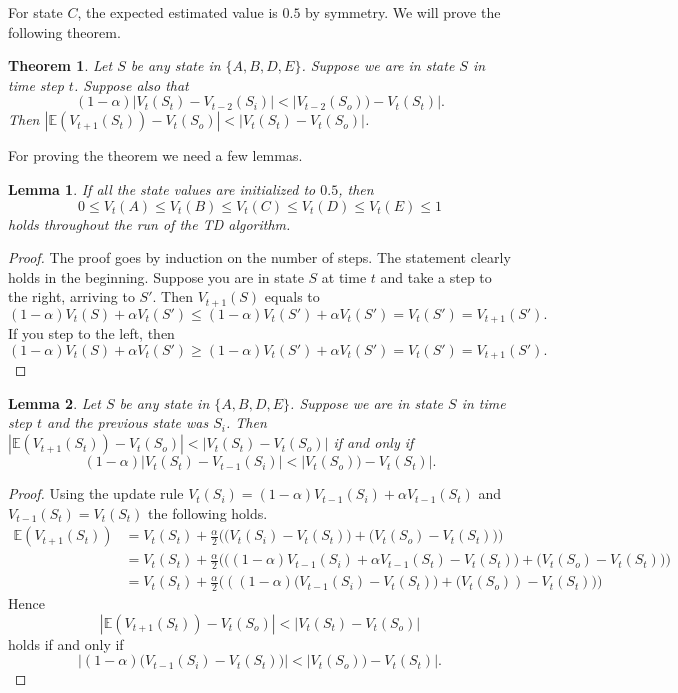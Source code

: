 \documentclass[12pt,a4paper]{article}
\newtheorem{lemma}{Lemma}
\newtheorem{thm}{Theorem}
\begin{document}
\begin{enumerate}
For state $C$, the expected estimated value is $0.5$ by symmetry. We will prove
the following theorem.
\begin{thm}\label{thm}
  Let $S$ be any state in $\{A, B, D, E\}$. Suppose we are in state $S$ in
  time step $t$. Suppose also that
  \[(1 - \alpha) |V_t(S_t) - V_{t - 2} (S_i)| < |V_{t - 2}(S_o)) - V_t(S_t)|.\] Then
  $|\mathbb{E}(V_{t + 1}(S_t)) - V_{t}(S_o)| < |V_t(S_t) - V_{t}(S_o)|$.
\end{thm}

For proving the theorem we need a few lemmas.

\begin{lemma}
  If all the state values are initialized to $0.5$, then
  \[0 \le V_t(A) \le V_t(B) \le V_t(C) \le V_t(D) \le V_t(E) \le 1\] holds throughout the
  run of the TD algorithm.
\end{lemma}
\begin{proof}
  The proof goes by induction on the number of steps. The statement clearly holds
  in the beginning. Suppose you are in state $S$ at time $t$ and take a step
  to the right, arriving to $S'$. Then $V_{t + 1}(S)$ equals to
  \[(1 - \alpha) V_t(S) + \alpha V_t(S') \le (1 - \alpha) V_t(S') + \alpha V_t(S') = V_t(S') = V_{t + 1}(S').\]
  If you step to the left, then
  \[(1 - \alpha) V_t(S) + \alpha V_t(S') \ge (1 - \alpha) V_t(S') + \alpha V_t(S') = V_t(S') = V_{t + 1}(S').\]
\end{proof}

\begin{lemma}
  Let $S$ be any state in $\{A, B, D, E\}$. Suppose we are in state $S$ in
  time step $t$ and the previous state was $S_i$. Then
  $|\mathbb{E}(V_{t + 1}(S_t)) - V_{t}(S_o)| < |V_t(S_t) - V_{t}(S_o)|$ if and only if
  \[
  (1 - \alpha) |V_t(S_t) - V_{t - 1} (S_i)| < |V_t(S_o)) - V_t(S_t)|.
  \]
\end{lemma}
\begin{proof}
  Using the update rule $ V_t(S_i) = (1 - \alpha) V_{t - 1}(S_i) + \alpha V_{t - 1}(S_t)$
  and $V_{t - 1}(S_t) = V_t(S_t)$ the following holds.
  \begin{align*}
  \mathbb{E}(V_{t + 1}(S_t))
  & = V_t(S_t) + \frac{\alpha}{2} \Big(\big(V_t(S_i) - V_t(S_t)\big) + \big(V_t(S_o) - V_t(S_t)\big)\Big)\\
  & = V_t(S_t) + \frac{\alpha}{2} \Big(\big((1 - \alpha) V_{t - 1}(S_i) +
  \alpha V_{t - 1}(S_t) - V_t(S_t)\big) + \big(V_t(S_o) - V_t(S_t)\big)\Big)\\
  & = V_t(S_t) + \frac{\alpha}{2} \Big(((1 - \alpha) \big(V_{t - 1}(S_i) - V_t(S_t)\big)
  + \big(V_t(S_o)) - V_t(S_t)\big)\Big)
  \end{align*}
  Hence
  \[|\mathbb{E}(V_{t + 1}(S_t)) - V_{t}(S_o)| < |V_t(S_t) - V_{t}(S_o)|\]
  holds if and only if
  \[|(1 - \alpha) \big(V_{t - 1}(S_i) - V_{t}(S_t)\big)| < |V_t(S_o)) - V_t(S_t)|.\]
\end{proof}


\end{enumerate}
\end{document}
